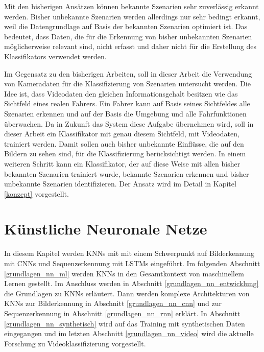 Mit den bisherigen Ansätzen können bekannte Szenarien sehr zuverlässig erkannt werden. Bisher unbekannte Szenarien werden allerdings nur sehr bedingt erkannt, weil die Datengrundlage auf Basis der bekannten Szenarien optimiert ist. Das bedeutet, dass Daten, die für die Erkennung von bisher unbekannten Szenarien möglicherweise relevant sind, nicht erfasst und daher nicht für die Erstellung des Klassifikators verwendet werden.

Im Gegensatz zu den bisherigen Arbeiten, soll in dieser Arbeit die Verwendung von Kameradaten für die Klassifizierung von Szenarien untersucht werden. Die Idee ist, dass Videodaten den gleichen Informationsgehalt besitzen wie das Sichtfeld eines realen Fahrers. Ein Fahrer kann auf Basis seines Sichtfeldes alle Szenarien erkennen und auf der Basis die Umgebung und alle Fahrfunktionen überwachen. Da in Zukunft das System diese Aufgabe übernehmen wird, soll in dieser Arbeit ein Klassifikator mit genau diesem Sichtfeld, mit Videodaten, trainiert werden. Damit sollen auch bisher unbekannte Einflüsse, die auf den Bildern zu sehen sind, für die Klassifizierung berücksichtigt werden. In einem weiteren Schritt kann ein Klassifikator, der auf diese Weise mit allen bisher bekannten Szenarien trainiert wurde, bekannte Szenarien erkennen und bisher unbekannte Szenarien identifizieren. Der Ansatz wird im Detail in Kapitel \ref{konzept} vorgestellt.

\section{Künstliche Neuronale Netze}
\label{grundlagen_nn}

In diesem Kapitel werden \acp{KNN} mit mit einem Schwerpunkt auf Bilderkennung mit \acp{CNN} und Sequenzerkennung mit \acp{LSTM} eingeführt. Im folgenden Abschnitt \ref{grundlagen_nn_ml} werden \acp{KNN} in den Gesamtkontext von maschinellem Lernen gestellt. Im Anschluss werden in Abschnitt \ref{grundlagen_nn_entwicklung} die Grundlagen zu \acp{KNN} erläutert. Dann werden komplexe Architekturen von \acp{KNN} zur Bilderkennung in Abschnitt \ref{grundlagen_nn_cnn} und zur Sequenzerkennung in Abschnitt \ref{grundlagen_nn_rnn} erklärt. In Abschnitt \ref{grundlagen_nn_synthetisch} wird auf das Training mit synthetischen Daten eingegangen und im letzten Abschnitt \ref{grundlagen_nn_video} wird die aktuelle Forschung zu Videoklassifizierung vorgestellt.

